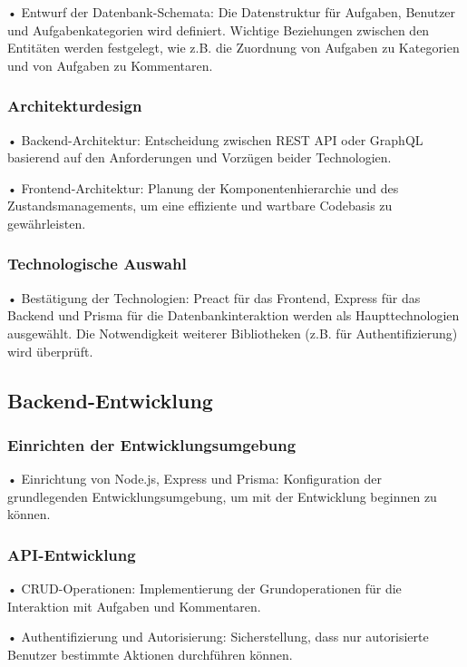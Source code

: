 \documentclass[12pt,a4paper]{article} %
\begin{document}
•	Entwurf der Datenbank-Schemata: Die Datenstruktur für Aufgaben, Benutzer und Aufgabenkategorien wird definiert. Wichtige Beziehungen zwischen den Entitäten werden festgelegt, wie z.B. die Zuordnung von Aufgaben zu Kategorien und von Aufgaben zu Kommentaren.

\subsubsection*{Architekturdesign}

•	Backend-Architektur: Entscheidung zwischen REST API oder GraphQL basierend auf den Anforderungen und Vorzügen beider Technologien.

•	Frontend-Architektur: Planung der Komponentenhierarchie und des Zustandsmanagements, um eine effiziente und wartbare Codebasis zu 
gewährleisten.

\subsubsection*{Technologische Auswahl}

•	Bestätigung der Technologien: Preact für das Frontend, Express für das Backend und Prisma für die Datenbankinteraktion werden als Haupttechnologien ausgewählt. Die Notwendigkeit weiterer Bibliotheken (z.B. für Authentifizierung) wird überprüft.

\subsection{Backend-Entwicklung}

\subsubsection*{Einrichten der Entwicklungsumgebung}

•	Einrichtung von Node.js, Express und Prisma: Konfiguration der grundlegenden Entwicklungsumgebung, um mit der Entwicklung beginnen 
zu können.

\subsubsection*{ API-Entwicklung}

•	    CRUD-Operationen: Implementierung der Grundoperationen für die Interaktion mit Aufgaben und Kommentaren.

•	    Authentifizierung und Autorisierung: Sicherstellung, dass nur autorisierte Benutzer bestimmte Aktionen durchführen können.
\end{document}
